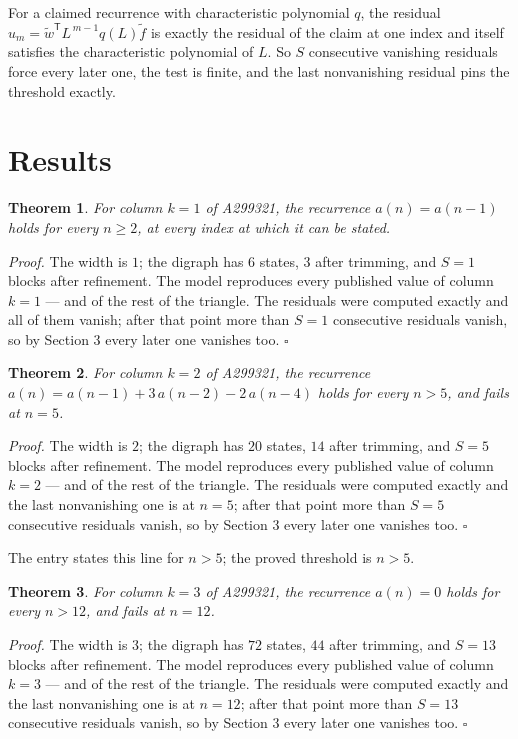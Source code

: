 \documentclass[11pt]{article}
\newtheorem{theorem}{Theorem}
\theoremstyle{definition}
\begin{document}
For a claimed recurrence with characteristic polynomial $q$, the residual $u_m = \tilde w^{\mathsf T}L^{\,m-1}q(L)\tilde f$ is exactly the residual of the claim at one index and itself satisfies the characteristic polynomial of $L$. So $S$ consecutive vanishing residuals force every later one, the test is finite, and the last nonvanishing residual pins the threshold exactly.

\section{Results}

\begin{theorem} For column $k = 1$ of A299321, the recurrence $a(n) = a(n-1)$ holds for every $n \ge 2$, at every index at which it can be stated.\end{theorem}

{\itshape Proof.} The width is $1$; the digraph has $6$ states, $3$ after trimming, and $S = 1$ blocks after refinement. The model reproduces every published value of column $k = 1$ --- and of the rest of the triangle. The residuals were computed exactly and all of them vanish; after that point more than $S = 1$ consecutive residuals vanish, so by Section 3 every later one vanishes too. $\square$

\begin{theorem} For column $k = 2$ of A299321, the recurrence $a(n) = a(n-1) + 3\,a(n-2) - 2\,a(n-4)$ holds for every $n > 5$, and fails at $n = 5$.\end{theorem}

{\itshape Proof.} The width is $2$; the digraph has $20$ states, $14$ after trimming, and $S = 5$ blocks after refinement. The model reproduces every published value of column $k = 2$ --- and of the rest of the triangle. The residuals were computed exactly and the last nonvanishing one is at $n = 5$; after that point more than $S = 5$ consecutive residuals vanish, so by Section 3 every later one vanishes too. $\square$

The entry states this line for $n > 5$; the proved threshold is $n > 5$.

\begin{theorem} For column $k = 3$ of A299321, the recurrence $a(n) = 0$ holds for every $n > 12$, and fails at $n = 12$.\end{theorem}

{\itshape Proof.} The width is $3$; the digraph has $72$ states, $44$ after trimming, and $S = 13$ blocks after refinement. The model reproduces every published value of column $k = 3$ --- and of the rest of the triangle. The residuals were computed exactly and the last nonvanishing one is at $n = 12$; after that point more than $S = 13$ consecutive residuals vanish, so by Section 3 every later one vanishes too. $\square$
\end{document}
